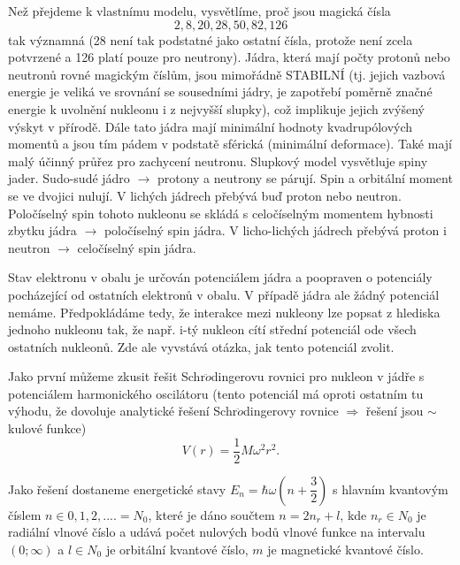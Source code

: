 \documentclass[../../main.tex]{subfiles}
\begin{document}
Než přejdeme k vlastnímu modelu, vysvětlíme, proč jsou magická čísla 
\begin{equation}
2,8,20,28,50,82,126 
\end{equation}
tak významná (28 není tak podstatné jako ostatní čísla, protože není zcela potvrzené a 126 platí pouze pro neutrony). Jádra, která mají počty protonů nebo neutronů rovné magickým číslům, jsou mimořádně STABILNÍ (tj. jejich vazbová energie je veliká ve srovnání se sousedními jádry, je zapotřebí poměrně značné energie k uvolnění nukleonu i z nejvyšší slupky), což implikuje jejich zvýšený výskyt v přírodě. Dále tato jádra mají minimální hodnoty kvadrupólových momentů a jsou tím pádem v podstatě sférická (minimální deformace). Také mají malý účinný průřez pro zachycení neutronu. Slupkový model vysvětluje spiny jader. Sudo-sudé jádro $\rightarrow$ protony a neutrony se párují. Spin a orbitální moment se ve dvojici nulují. V lichých jádrech přebývá buď proton nebo neutron. Poločíselný spin tohoto nukleonu se skládá s celočíselným momentem hybnosti zbytku jádra $\rightarrow$ poločíselný spin jádra. V licho-lichých jádrech přebývá proton i neutron $\rightarrow$ celočíselný spin jádra.

Stav elektronu v obalu je určován potenciálem jádra a poopraven o potenciály pocházející od ostatních elektronů v obalu. V případě jádra ale žádný potenciál nemáme. Předpokládáme tedy, že interakce mezi nukleony lze popsat z hlediska jednoho nukleonu tak, že např. i-tý nukleon cítí střední potenciál ode všech ostatních nukleonů. Zde ale vyvstává otázka, jak tento potenciál zvolit.

Jako první můžeme zkusit řešit Schr$\ddot{o}$dingerovu rovnici pro nukleon v jádře s potenciálem harmonického oscilátoru (tento potenciál má oproti ostatním tu výhodu, že dovoluje analytické řešení Schr$\ddot{o}$dingerovy rovnice $\Rightarrow$ řešení jsou $\sim $ kulové funkce)
\begin{equation}
V(r)= \dfrac{1}{2} M \omega ^2 r^2 .
\end{equation}

Jako řešení dostaneme energetické stavy $E_n = \hbar \omega (n + \dfrac{3}{2})$ s hlavním kvantovým číslem $n \in 0,1,2, .... = N_0$, které je dáno součtem $n = 2n_r + l$, kde $n_r \in N_0$ je radiální vlnové číslo a udává počet nulových bodů vlnové funkce na intervalu $(0; \infty)$ a $l \in N_0$ je orbitální kvantové číslo, $m$ je magnetické kvantové číslo. 
\end{document}
